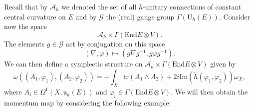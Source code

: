 \documentclass[12pt,a4paper]{book}
\theoremstyle{definition} \newtheorem{defn}[thm]{Definition}
\theoremstyle{definition} \newtheorem{ejemplo}[thm]{Example}
\theoremstyle{remark} \newtheorem{rem}[thm]{Remark}
\def\AA{\mathscr{A}}
\def\GG{\mathscr{G}}
\def\tr{\mathrm{tr}}
\def\End{\mathrm{End}}
\def\UU{\mathrm{U}}
\def\uu{\mathfrak{u}}
\begin{document}
    Recall that by $\AA_h$ we denoted the set of all $h$-unitary connections of constant central curvature on $E$ and by $\GG$ the (real) gauge group $\Gamma(\UU_h(E))$. Consider now the space 
    \begin{equation*}
      \AA_h \times \Gamma(\End E \otimes V).
    \end{equation*}
    The elements $g\in \GG$ act by conjugation on this space
    \begin{equation*}
      (\nabla,\varphi) \longmapsto (g\nabla g^{-1}, g\varphi g^{-1}).
    \end{equation*}
    We can then define a symplectic structure on $\AA_h\times \Gamma(\End E \otimes V)$ given by
    \begin{equation*}
      \omega\left( (A_1,\varphi_1),(A_2,\varphi_2) \right)=-\int_X \tr(A_1 \wedge A_2) + 2i \mathrm{Im}(\tilde{h}(\varphi_1, \varphi_2)) \omega_X,
    \end{equation*}
    where $A_i\in \Omega^1(X,\uu_h(E))$ and $\varphi_i \in \Gamma(\End E \otimes V)$. We will then obtain the momentum map by considering the following example:
\end{document}
